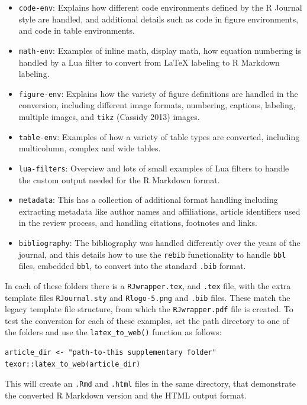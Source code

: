 \begin{itemize}
\tightlist
\item
  \texttt{code-env}: Explains how different code environments defined by the R Journal style are handled, and additional details such as code in figure environments, and code in table environments.
\item
  \texttt{math-env}: Examples of inline math, display math, how equation numbering is handled by a Lua filter to convert from LaTeX labeling to R Markdown labeling.
\item
  \texttt{figure-env}: Explains how the variety of figure definitions are handled in the conversion, including different image formats, numbering, captions, labeling, multiple images, and \texttt{tikz} (Cassidy 2013) images.
\item
  \texttt{table-env}: Examples of how a variety of table types are converted, including multicolumn, complex and wide tables.
\item
  \texttt{lua-filters}: Overview and lots of small examples of Lua filters to handle the custom output needed for the R Markdown format.
\item
  \texttt{metadata}: This has a collection of additional format handling including extracting metadata like author names and affiliations, article identifiers used in the review process, and handling citations, footnotes and links.
\item
  \texttt{bibliography}: The bibliography was handled differently over the years of the journal, and this details how to use the \texttt{rebib} functionality to handle \texttt{bbl} files, embedded \texttt{bbl}, to convert into the standard \texttt{.bib} format.
\end{itemize}

In each of these folders there is a \texttt{RJwrapper.tex}, and \texttt{.tex} file, with the extra template files \texttt{RJournal.sty} and \texttt{Rlogo-5.png} and \texttt{.bib} files. These match the legacy template file structure, from which the \texttt{RJwrapper.pdf} file is created. To test the conversion for each of these examples, set the path directory to one of the folders and use the \texttt{latex\_to\_web()} function as follows:

\begin{verbatim}
article_dir <- "path-to-this supplementary folder"
texor::latex_to_web(article_dir)
\end{verbatim}

This will create an \texttt{.Rmd} and \texttt{.html} files in the same directory, that demonstrate the converted R Markdown version and the HTML output format.

